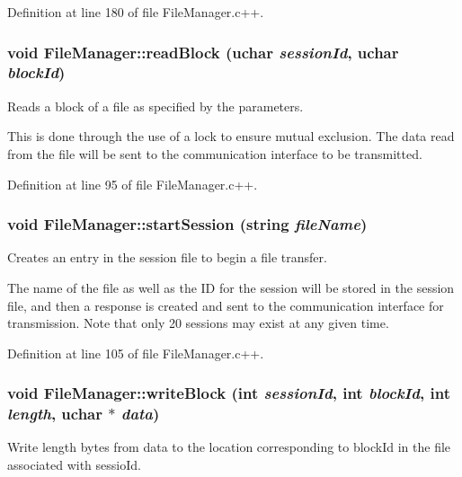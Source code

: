 Definition at line 180 of file FileManager.c++.

\hypertarget{class_file_manager_aa4e29db00b18f76e9077ccfae86ead2e}{
\subsubsection[{readBlock}]{\setlength{\rightskip}{0pt plus 5cm}void FileManager::readBlock (uchar {\em sessionId}, \/  uchar {\em blockId})}}
\label{class_file_manager_aa4e29db00b18f76e9077ccfae86ead2e}
Reads a block of a file as specified by the parameters.

This is done through the use of a lock to ensure mutual exclusion. The data read from the file will be sent to the communication interface to be transmitted. 

Definition at line 95 of file FileManager.c++.

\hypertarget{class_file_manager_ab6fdba3fb4643d07e387f67d46f264f2}{
\subsubsection[{startSession}]{\setlength{\rightskip}{0pt plus 5cm}void FileManager::startSession (string {\em fileName})}}
\label{class_file_manager_ab6fdba3fb4643d07e387f67d46f264f2}
Creates an entry in the session file to begin a file transfer.

The name of the file as well as the ID for the session will be stored in the session file, and then a response is created and sent to the communication interface for transmission. Note that only 20 sessions may exist at any given time. 

Definition at line 105 of file FileManager.c++.

\hypertarget{class_file_manager_a9b00c266d6a279a7fe9d1b18649d93c7}{
\subsubsection[{writeBlock}]{\setlength{\rightskip}{0pt plus 5cm}void FileManager::writeBlock (int {\em sessionId}, \/  int {\em blockId}, \/  int {\em length}, \/  uchar $\ast$ {\em data})}}
\label{class_file_manager_a9b00c266d6a279a7fe9d1b18649d93c7}
Write length bytes from data to the location corresponding to blockId in the file associated with sessioId.

